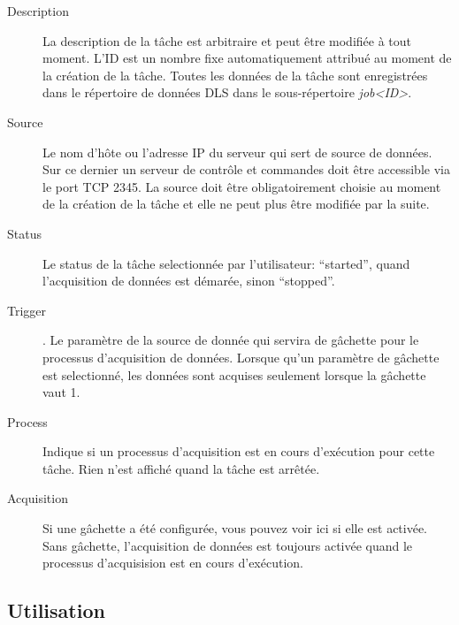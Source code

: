 \documentclass[a4paper,12pt,BCOR6mm,bibtotoc,idxtotoc]{scrbook}
\begin{document}
\begin{description}
\item[Description]
  La description de la t\^ache est arbitraire et peut \^etre modifi\'ee
  \`a tout moment. L'ID est un nombre fixe automatiquement attribu\'e
  au moment de la cr\'eation de la t\^ache. Toutes les donn\'ees de la
  t\^ache sont enregistr\'ees dans le r\'epertoire de donn\'ees DLS
  dans le sous-r\'epertoire \textit{job\textless ID\textgreater}.

\item[Source]
  Le nom d'h\^ote ou l'adresse IP du serveur qui sert de source de
  donn\'ees.  Sur ce dernier un serveur de contr\^ole et commandes
  doit \^etre accessible via le port TCP 2345.  La source doit \^etre
  obligatoirement choisie au moment de la cr\'eation de la t\^ache et
  elle ne peut plus \^etre modifi\'ee par la suite.

\item[Status]
  Le status de la t\^ache selectionn\'ee par l'utilisateur: ``started'',
  quand l'acquisition de donn\'ees est d\'emar\'ee, sinon ``stopped''.

\item[Trigger].
  Le param\`etre de la source de donn\'ee qui servira de g\^achette
  pour le processus d'acquisition de donn\'ees. Lorsque qu'un
  param\`etre de g\^achette est selectionn\'e, les donn\'ees sont
  acquises seulement lorsque la g\^achette vaut 1.

\item[Process]
  Indique si un processus d'acquisition est en cours d'ex\'ecution pour
  cette t\^ache. Rien n'est affich\'e quand la t\^ache est arr\^et\'ee.

\item[Acquisition]
  Si une g\^achette a \'et\'e configur\'ee, vous pouvez voir ici si
  elle est activ\'ee.  Sans g\^achette, l'acquisition de donn\'ees est
  toujours activ\'ee quand le processus d'acquisision est en cours
  d'ex\'ecution.

\end{description}


\subsection{Utilisation}
\end{document}
